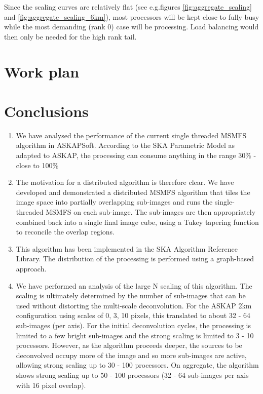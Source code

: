 \documentclass[11pt,a4paper,variablewidth]{article}
\begin{document}
Since the scaling curves are relatively flat (see e.g.figures \ref{fig:aggregate_scaling} and \ref{fig:aggregate_scaling_6km}), most processors will be kept close to fully busy while the most demanding (rank 0) case will be processing. Load balancing would then only be needed for the high rank tail.

\pagebreak
\section{Work plan}

\pagebreak
\section{Conclusions}

\begin{enumerate}
	\item We have analysed the performance of the current single threaded MSMFS algorithm in ASKAPSoft. According to the SKA Parametric Model as adapted to ASKAP, the processing can consume anything in the range 30\% - close to 100\%
	\item The motivation for a distributed algorithm is therefore clear. We have developed and demonstrated a distributed MSMFS algorithm that tiles the image space into partially overlapping sub-images and runs the single-threaded MSMFS on each sub-image. The sub-images are then appropriately combined back into a single final image cube, using a Tukey tapering function to reconcile the overlap regions.
	\item This algorithm has been implemented in the SKA Algorithm Reference Library. The distribution of the processing is performed using a graph-based approach.
	\item We have performed an analysis of the large N scaling of this algorithm. The scaling is ultimately determined by the number of sub-images that can be used without distorting the multi-scale deconvolution. For the ASKAP 2km configuration using scales of 0, 3, 10 pixels, this translated to about 32 - 64 sub-images (per axis). For the initial deconvolution cycles, the processing is limited to a few bright sub-images and the strong scaling is limited to 3 - 10 processors. However, as the algorithm proceeds deeper, the sources to be deconvolved occupy more of the image and so more sub-images are active, allowing strong scaling up to 30 - 100 processors. On aggregate, the algorithm shows strong scaling up to 50 - 100 processors (32 - 64 sub-images per axis with 16 pixel overlap).

\end{enumerate}
\end{document}
